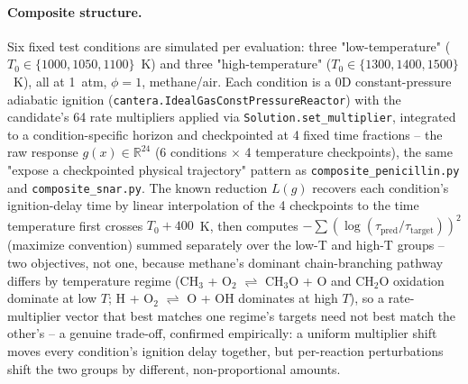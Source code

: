 \documentclass[11pt]{article}
\begin{document}
\paragraph{Composite structure.} Six fixed test conditions are
simulated per evaluation: three "low-temperature" ($T_0 \in
\{1000, 1050, 1100\}$~K) and three "high-temperature" ($T_0 \in
\{1300, 1400, 1500\}$~K), all at 1~atm, $\phi = 1$, methane/air. Each
condition is a 0D constant-pressure adiabatic ignition
(\texttt{cantera.IdealGasConstPressureReactor}) with the candidate's 64
rate multipliers applied via \texttt{Solution.set\_multiplier}, integrated
to a condition-specific horizon and checkpointed at 4 fixed time
fractions -- the raw response $g(x) \in \mathbb{R}^{24}$ (6 conditions
$\times$ 4 temperature checkpoints), the same "expose a checkpointed
physical trajectory" pattern as \texttt{composite\_penicillin.py} and
\texttt{composite\_snar.py}. The known reduction $L(g)$ recovers each
condition's ignition-delay time by linear interpolation of the 4
checkpoints to the time temperature first crosses $T_0 + 400$~K, then
computes $-\sum (\log(\tau_{\mathrm{pred}}/\tau_{\mathrm{target}}))^2$
(maximize convention) summed separately over the low-T and high-T
groups -- two objectives, not one, because methane's dominant
chain-branching pathway differs by temperature regime (CH$_3$ + O$_2$
$\rightleftharpoons$ CH$_3$O + O and CH$_2$O oxidation dominate at low
$T$; H + O$_2$ $\rightleftharpoons$ O + OH dominates at high $T$), so a
rate-multiplier vector that best matches one regime's targets need not
best match the other's -- a genuine trade-off, confirmed empirically: a
uniform multiplier shift moves every condition's ignition delay together,
but per-reaction perturbations shift the two groups by different,
non-proportional amounts.
\end{document}
